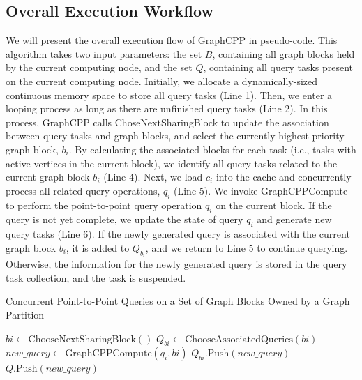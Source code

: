 \documentclass[lettersize,journal]{IEEEtran} %
\begin{document}
\subsection{Overall Execution Workflow}
We will present the overall execution flow of GraphCPP in pseudo-code. This algorithm takes two input parameters: the set $B$, containing all graph blocks held by the current computing node, and the set $Q$, containing all query tasks present on the current computing node. Initially, we allocate a dynamically-sized continuous memory space to store all query tasks (Line 1). Then, we enter a looping process as long as there are unfinished query tasks (Line 2). In this process, GraphCPP calls ChoseNextSharingBlock to update the association between query tasks and graph blocks, and select the currently highest-priority graph block, $b_i$. By calculating the associated blocks for each task (i.e., tasks with active vertices in the current block), we identify all query tasks related to the current graph block $b_i$ (Line 4). Next, we load $c_i$ into the cache and concurrently process all related query operations, $q_i$ (Line 5). We invoke GraphCPPCompute to perform the point-to-point query operation $q_i$ on the current block. If the query is not yet complete, we update the state of query $q_i$ and generate new query tasks (Line 6). If the newly generated query is associated with the current graph block $b_i$, it is added to $Q_{b_i}$, and we return to Line 5 to continue querying. Otherwise, the information for the newly generated query is stored in the query task collection, and the task is suspended.

\begin{algorithm}
  \caption{Concurrent Point-to-Point Queries on a Set of Graph Blocks Owned by a Graph Partition}
  \label{algorithm:concurrent-queries}
  \begin{algorithmic}[1]
   
          \State $bi \gets \text{ChooseNextSharingBlock}()$
          \State $Q_{bi} \gets \text{ChooseAssociatedQueries}(bi)$
           
              \State $new\_query \gets \text{GraphCPPCompute}(q_i, bi)$ 
                  \State $Q_{bi}.\text{Push}(new\_query)$
              \Else
                  \State $Q.\text{Push}(new\_query)$
              \EndIf
          \EndFor
      \EndWhile
  \EndProcedure
  \end{algorithmic}
  \end{algorithm}
  
\end{document}
